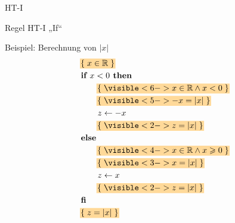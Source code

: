 \begin{frame}{HT-I}
\begin{minipage}{0.55\linewidth}
\begin{block}{Regel HT-I \quad „If“}
\begin{itemize}
			\end{itemize}
		\end{block}
	\end{minipage}
\end{frame}

\begin{frame}{Beispiel: Berechnung von $\vert x \vert$}
	\vspace{-10mm}
	\begin{align*}
		&\assert{ x \in\R} \\
		&\textbf{if } x < 0 \textbf{ then } \\
		&\hspace{2em} \assert{ \visible<6->{ x\in\R\wedge x < 0 } } \\
		&\hspace{2em} \assert{ \visible<5->{ {-x} = \vert x \vert } } \\
		&\hspace{2em}  z \gets -x   \\
		&\hspace{2em} \assert{ \visible<2->{ z = \vert x \vert } } \\
		&\textbf{else} \\
		&\hspace{2em} \assert{ \visible<4->{ x\in\R\wedge x\geq 0 } } \\
		&\hspace{2em} \assert{ \visible<3->{ x = \vert x \vert } } \\
		&\hspace{2em} z \gets x \\
		&\hspace{2em} \assert{ \visible<2->{ z = \vert x \vert } } \\
		&\textbf{fi} \\
		&\assert{ z = \vert x \vert } 
	\end{align*}
\end{frame}

